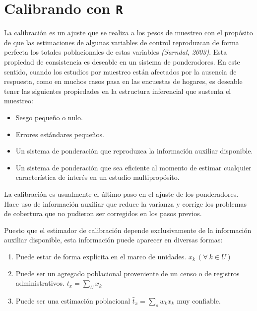 \documentclass[
  12pt,
]{book}
\providecommand{\tightlist}{%
  \setlength{\itemsep}{0pt}\setlength{\parskip}{0pt}}
\begin{document}
\hypertarget{calibrando-con-r}{%
\section{\texorpdfstring{Calibrando con \texttt{R}}{Calibrando con R}}\label{calibrando-con-r}}

La calibración es un ajuste que se realiza a los pesos de muestreo con el propósito de que las estimaciones de algunas variables de control reproduzcan de forma perfecta los totales poblacionales de estas variables \emph{(Sarndal, 2003)}. Esta propiedad de consistencia es deseable en un sistema de ponderadores. En este sentido, cuando los estudios por muestreo están afectados por la ausencia de respuesta, como en muchos casos pasa en las encuestas de hogares, es deseable tener las siguientes propiedades en la estructura inferencial que sustenta el muestreo:

\begin{itemize}
\tightlist
\item
  Sesgo pequeño o nulo.
\item
  Errores estándares pequeños.
\item
  Un sistema de ponderación que reproduzca la información auxiliar disponible.
\item
  Un sistema de ponderación que sea eficiente al momento de estimar cualquier característica de interés en un estudio multipropósito.
\end{itemize}

La calibración es usualmente el último paso en el ajuste de los ponderadores. Hace uso de información auxiliar que reduce la varianza y corrige los problemas de cobertura que no pudieron ser corregidos en los pasos previos.

Puesto que el estimador de calibración depende exclusivamente de la información auxiliar disponible, esta información puede aparecer en diversas formas:

\begin{enumerate}
\def\labelenumi{\arabic{enumi}.}
\item
  Puede estar de forma explícita en el marco de unidades. \(x_k \ (\forall \ k \in U)\)
\item
  Puede ser un agregado poblacional proveniente de un censo o de registros administrativos. \(t_x = \sum_U x_k\)
\item
  Puede ser una estimación poblacional \(\hat{t}_x = \sum_s w_kx_k\) muy confiable.
\end{enumerate}
\end{document}
